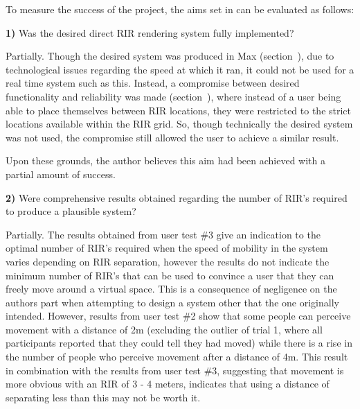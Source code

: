 \documentclass[../../main.tex]{subfiles}
\begin{document}
			To measure the success of the project, the aims set in  can be evaluated as follows:

			\textbf{1)} Was the desired direct \ac{RIR} rendering system fully implemented?

				Partially. Though the desired system was produced in Max (section~), due to technological issues regarding the speed at which it ran, it could not be used for a real time system such as this. Instead, a compromise between desired functionality and reliability was made (section~), where instead of a user being able to place themselves between \ac{RIR} locations, they were restricted to the strict locations available within the \ac{RIR} grid. So, though technically the desired system was not used, the compromise still allowed the user to achieve a similar result.

				Upon these grounds, the author believes this aim had been achieved with a partial amount of success.


			\textbf{2)} Were comprehensive results obtained regarding the number of \ac{RIR}'s required to produce a plausible system?


				Partially. The results obtained from user test \#3 give an indication to the optimal number of \ac{RIR}'s required when the speed of mobility in the system varies depending on \ac{RIR} separation, however the results do not indicate the minimum number of \ac{RIR}'s that can be used to convince a user that they can freely move around a virtual space. This is a consequence of negligence on the authors part when attempting to design a system other that the one originally intended. However, results from user test \#2 show that some people can perceive movement with a distance of 2m (excluding the outlier of trial 1, where all participants reported that they could tell they had moved) while there is a rise in the number of people who perceive movement after a distance of 4m. This result in combination with the results from user test \#3, suggesting that movement is more obvious with an \ac{RIR} of 3 - 4 meters, indicates that using a distance of separating less than this may not be worth it. %


\end{document}
